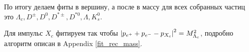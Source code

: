 По итогу делаем фиты в вершину, а после в массу для всех собранных частиц это 
$\Lambda_c, D^{\pm}, D^0, D^{*\pm}, D^{*0}, \Lambda, K_s^0$.

\newdot Для импульс $X_c$ фитируем так чтобы $\abs{p_{e^+} + p_{e^-} - p_{X_c}}^2 = M^2_{\Lambda_c}$, 
подробно алгоритм описан в Appendix \ref{fit_rec_mass}. 

 







